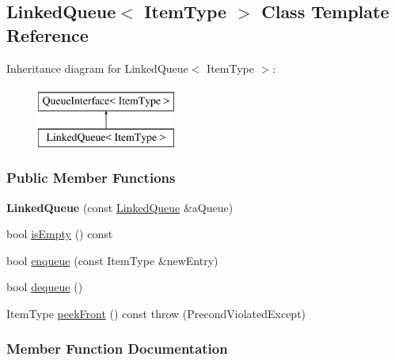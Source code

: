 \hypertarget{class_linked_queue}{}\subsection{Linked\+Queue$<$ Item\+Type $>$ Class Template Reference}
\label{class_linked_queue}
Inheritance diagram for Linked\+Queue$<$ Item\+Type $>$\+:\begin{figure}[H]
\begin{center}
\leavevmode
\includegraphics[height=2.000000cm]{class_linked_queue}
\end{center}
\end{figure}
\subsubsection*{Public Member Functions}
\begin{DoxyCompactItemize}
\item 
{\bfseries Linked\+Queue} (const \hyperlink{class_linked_queue}{Linked\+Queue} \&a\+Queue)\hypertarget{class_linked_queue_af17a17a7aa2e191b957d51a73fd54108}{}\label{class_linked_queue_af17a17a7aa2e191b957d51a73fd54108}

\item 
bool \hyperlink{class_linked_queue_ab7c69e207152221746b0d9b089ad4690}{is\+Empty} () const 
\item 
bool \hyperlink{class_linked_queue_a3a46a8aa575cc665f83eae4610837998}{enqueue} (const Item\+Type \&new\+Entry)
\item 
bool \hyperlink{class_linked_queue_a9058a9285a7f8ff6fd27b72347602162}{dequeue} ()
\item 
Item\+Type \hyperlink{class_linked_queue_a712f57ac62e93c0e13af4e0f18aa4fcd}{peek\+Front} () const   throw (\+Precond\+Violated\+Except)
\end{DoxyCompactItemize}


\subsubsection{Member Function Documentation}
